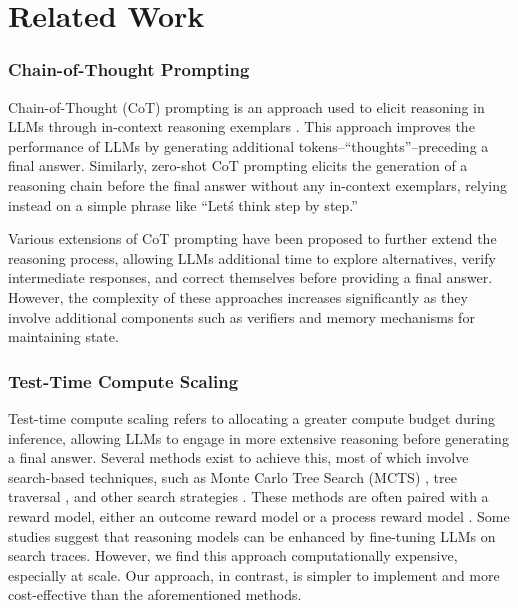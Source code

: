 \section{Related Work}
\subsubsection{Chain-of-Thought Prompting}

Chain-of-Thought (CoT) prompting \citep{wei2022chain} is an approach used to elicit reasoning in LLMs through in-context reasoning exemplars \citep{NEURIPS2020_1457c0d6}. This approach improves the performance of LLMs by generating additional tokens--``thoughts''--preceding a final answer. Similarly, zero-shot CoT prompting \citep{kojima2022large} elicits the generation of a reasoning chain before the final answer without any in-context exemplars, relying instead on a simple phrase like ``Let\'s think step by step.''

Various extensions of CoT prompting \citep{yao2023tree, Besta_Blach_Kubicek_Gerstenberger_Podstawski_Gianinazzi_Gajda_Lehmann_Niewiadomski_Nyczyk_Hoefler_2024, zhou2023threadthoughtunravelingchaotic} have been proposed to further extend the reasoning process, allowing LLMs additional time to explore alternatives, verify intermediate responses, and correct themselves before providing a final answer. However, the complexity of these approaches increases significantly as they involve additional components such as verifiers and memory mechanisms for maintaining state.

\subsubsection{Test-Time Compute Scaling}

Test-time compute scaling \citep{snell2024scalingllmtesttimecompute} refers to allocating a greater compute budget during inference, allowing LLMs to engage in more extensive reasoning before generating a final answer. Several methods exist to achieve this, most of which involve search-based techniques, such as Monte Carlo Tree Search (MCTS) \citep{ding-etal-2024-everything,duan2025promptbasedmontecarlotree}, tree traversal \citep{yao2023tree,Besta_Blach_Kubicek_Gerstenberger_Podstawski_Gianinazzi_Gajda_Lehmann_Niewiadomski_Nyczyk_Hoefler_2024,bi2025forestofthoughtscalingtesttimecompute}, and other search strategies \citep{snell2024scalingllmtesttimecompute,wang2024openropensourceframework}. These methods are often paired with a reward model, either an outcome reward model \citep{beeching2024scalingtesttimecompute} or a process reward model \citep{snell2024scalingllmtesttimecompute}. Some studies \citep{qin2024o1replicationjourneystrategic,guan2025rstarmathsmallllmsmaster} suggest that reasoning models can be enhanced by fine-tuning LLMs on search traces. However, we find this approach computationally expensive, especially at scale. Our approach, in contrast, is simpler to implement and more cost-effective than the aforementioned methods.

